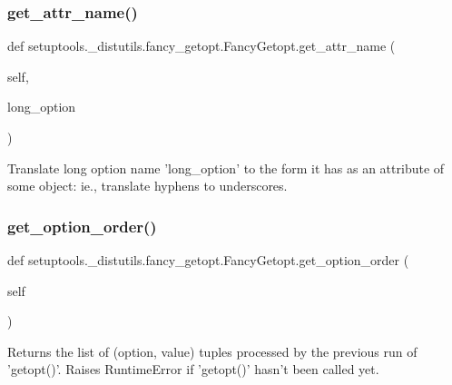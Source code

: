 \subsubsection{\texorpdfstring{get\+\_\+attr\+\_\+name()}{get\_attr\_name()}}
{\footnotesize\ttfamily def setuptools.\+\_\+distutils.\+fancy\+\_\+getopt.\+Fancy\+Getopt.\+get\+\_\+attr\+\_\+name (\begin{DoxyParamCaption}\item[{}]{self,  }\item[{}]{long\+\_\+option }\end{DoxyParamCaption})}

\begin{DoxyVerb}Translate long option name 'long_option' to the form it
has as an attribute of some object: ie., translate hyphens
to underscores.\end{DoxyVerb}
 \mbox{\label{classsetuptools_1_1__distutils_1_1fancy__getopt_1_1FancyGetopt_a080bca8d9edee4aa7cd7da4502fae610}} 
\subsubsection{\texorpdfstring{get\+\_\+option\+\_\+order()}{get\_option\_order()}}
{\footnotesize\ttfamily def setuptools.\+\_\+distutils.\+fancy\+\_\+getopt.\+Fancy\+Getopt.\+get\+\_\+option\+\_\+order (\begin{DoxyParamCaption}\item[{}]{self }\end{DoxyParamCaption})}

\begin{DoxyVerb}Returns the list of (option, value) tuples processed by the
previous run of 'getopt()'.  Raises RuntimeError if
'getopt()' hasn't been called yet.
\end{DoxyVerb}
 \mbox{\label{classsetuptools_1_1__distutils_1_1fancy__getopt_1_1FancyGetopt_a1fc0fc155046e8c9aa56d6e5a4258b43}} 
